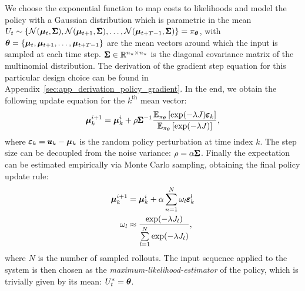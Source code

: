 We choose the exponential function to map costs to likelihoods and model the policy with a Gaussian distribution which is parametric in the mean $U_t \sim \{\mathcal{N}(\boldsymbol{\mu}_t, \pmb{\Sigma}), \mathcal{N}(\boldsymbol{\mu}_{t+1}, \pmb{\Sigma}), \dots, \mathcal{N}(\boldsymbol{\mu}_{t+T-1}, \pmb{\Sigma})\} = \pi_{\boldsymbol{\theta}}$, with $\boldsymbol{\theta} =  \{\boldsymbol{\mu}_t, \boldsymbol{\mu}_{t+1}, \dots, \boldsymbol{\mu}_{t+T-1}\}$ are the mean vectors around which the input is sampled at each time step. $\pmb{\Sigma} \in \mathbb{R}^{n_u \times n_u}$ is the diagonal covariance matrix of the multinomial distribution. The derivation of the gradient step equation for this particular design choice can be found in Appendix~\ref{sec:app_derivation_policy_gradient}. In the end, we obtain the following update equation for the $k^{\text{th}}$ mean vector:
\begin{equation}
    \boldsymbol{\mu}^{i+1}_{k} = \boldsymbol{\mu}^{i}_{k} +  \rho \pmb{\Sigma}^{-1} \frac{\mathbb{E}_{\pi_{\boldsymbol{\theta}}} \left [\exp( -\lambda J) \pmb{\varepsilon}_k \right]}{\mathbb{E}_{\pi_{\boldsymbol{\theta}}} \left [\exp( -\lambda J)\right]}  \label{eq:alpha_assumption},
\end{equation}
where $\pmb{\varepsilon}_k = \pmb{u}_k - \boldsymbol{\mu}_k$ is the random policy perturbation at time index $k$.
The step size can be decoupled from the noise variance: $\rho = \alpha \pmb{\Sigma} $. Finally the expectation can be estimated empirically via Monte Carlo sampling, obtaining the final policy update rule:
\begin{align} \label{eq:update_rule}
  \boldsymbol{\mu}^{i+1}_{k} &= \boldsymbol{\mu}^{i}_{k} + \alpha  \sum \limits_{n=1}^{N}  \omega_l \pmb{\varepsilon}_{k}^{l} \\
  \omega_l  &\approx \frac{\exp ( -\lambda J_l )}{\sum \limits_{l=1}^{N} \exp ( -\lambda J_l)}, \label{eq:weighting}
\end{align}
where $N$ is the number of sampled rollouts. 
The input sequence applied to the system is then chosen as the \emph{maximum-likelihood-estimator} of the policy, which is trivially given by its mean: $U^*_t = \boldsymbol{\theta}$.

